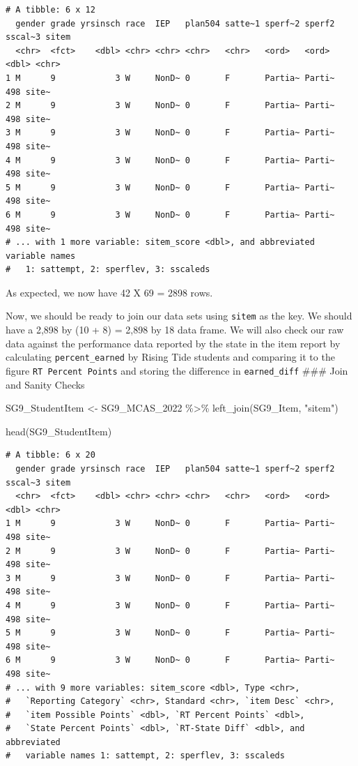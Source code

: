 \documentclass[
  letterpaper,
  DIV=11,
  numbers=noendperiod]{scrartcl}
\newenvironment{Shaded}{\begin{snugshade}}{\end{snugshade}}
\newcommand{\FunctionTok}[1]{\textcolor[rgb]{0.28,0.35,0.67}{#1}}
\newcommand{\NormalTok}[1]{\textcolor[rgb]{0.00,0.23,0.31}{#1}}
\newcommand{\OtherTok}[1]{\textcolor[rgb]{0.00,0.23,0.31}{#1}}
\newcommand{\SpecialCharTok}[1]{\textcolor[rgb]{0.37,0.37,0.37}{#1}}
\newcommand{\StringTok}[1]{\textcolor[rgb]{0.13,0.47,0.30}{#1}}
\begin{document}
\begin{verbatim}
# A tibble: 6 x 12
  gender grade yrsinsch race  IEP   plan504 satte~1 sperf~2 sperf2 sscal~3 sitem
  <chr>  <fct>    <dbl> <chr> <chr> <chr>   <chr>   <ord>   <ord>    <dbl> <chr>
1 M      9            3 W     NonD~ 0       F       Partia~ Parti~     498 site~
2 M      9            3 W     NonD~ 0       F       Partia~ Parti~     498 site~
3 M      9            3 W     NonD~ 0       F       Partia~ Parti~     498 site~
4 M      9            3 W     NonD~ 0       F       Partia~ Parti~     498 site~
5 M      9            3 W     NonD~ 0       F       Partia~ Parti~     498 site~
6 M      9            3 W     NonD~ 0       F       Partia~ Parti~     498 site~
# ... with 1 more variable: sitem_score <dbl>, and abbreviated variable names
#   1: sattempt, 2: sperflev, 3: sscaleds
\end{verbatim}

As expected, we now have 42 X 69 = 2898 rows.

Now, we should be ready to join our data sets using \texttt{sitem} as
the key. We should have a 2,898 by (10 + 8) = 2,898 by 18 data frame. We
will also check our raw data against the performance data reported by
the state in the item report by calculating \texttt{percent\_earned} by
Rising Tide students and comparing it to the figure
\texttt{RT\ Percent\ Points} and storing the difference in
\texttt{earned\_diff} \#\#\# Join and Sanity Checks

\begin{Shaded}
\begin{Highlighting}[]
\NormalTok{SG9\_StudentItem }\OtherTok{\textless{}{-}}\NormalTok{ SG9\_MCAS\_2022 }\SpecialCharTok{\%\textgreater{}\%}
  \FunctionTok{left\_join}\NormalTok{(SG9\_Item, }\StringTok{"sitem"}\NormalTok{)}


\FunctionTok{head}\NormalTok{(SG9\_StudentItem)}
\end{Highlighting}
\end{Shaded}

\begin{verbatim}
# A tibble: 6 x 20
  gender grade yrsinsch race  IEP   plan504 satte~1 sperf~2 sperf2 sscal~3 sitem
  <chr>  <fct>    <dbl> <chr> <chr> <chr>   <chr>   <ord>   <ord>    <dbl> <chr>
1 M      9            3 W     NonD~ 0       F       Partia~ Parti~     498 site~
2 M      9            3 W     NonD~ 0       F       Partia~ Parti~     498 site~
3 M      9            3 W     NonD~ 0       F       Partia~ Parti~     498 site~
4 M      9            3 W     NonD~ 0       F       Partia~ Parti~     498 site~
5 M      9            3 W     NonD~ 0       F       Partia~ Parti~     498 site~
6 M      9            3 W     NonD~ 0       F       Partia~ Parti~     498 site~
# ... with 9 more variables: sitem_score <dbl>, Type <chr>,
#   `Reporting Category` <chr>, Standard <chr>, `item Desc` <chr>,
#   `item Possible Points` <dbl>, `RT Percent Points` <dbl>,
#   `State Percent Points` <dbl>, `RT-State Diff` <dbl>, and abbreviated
#   variable names 1: sattempt, 2: sperflev, 3: sscaleds
\end{verbatim}
\end{document}

